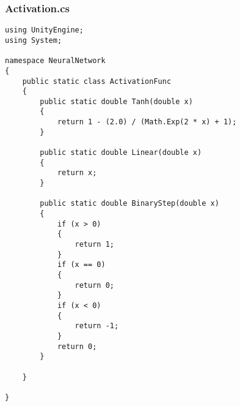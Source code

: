 \documentclass[12pt,a4paper]{article}
\begin{document}
\subsubsection*{Activation.cs}
\begin{lstlisting}
using UnityEngine;
using System;

namespace NeuralNetwork
{
    public static class ActivationFunc
    {
        public static double Tanh(double x)
        {
            return 1 - (2.0) / (Math.Exp(2 * x) + 1);
        }

        public static double Linear(double x)
        {
            return x;
        }

        public static double BinaryStep(double x)
        {
            if (x > 0)
            {
                return 1;
            }
            if (x == 0)
            {
                return 0;
            }
            if (x < 0)
            {
                return -1;
            }
            return 0;
        }

    }

}
\end{lstlisting}
\pagebreak
\end{document}
